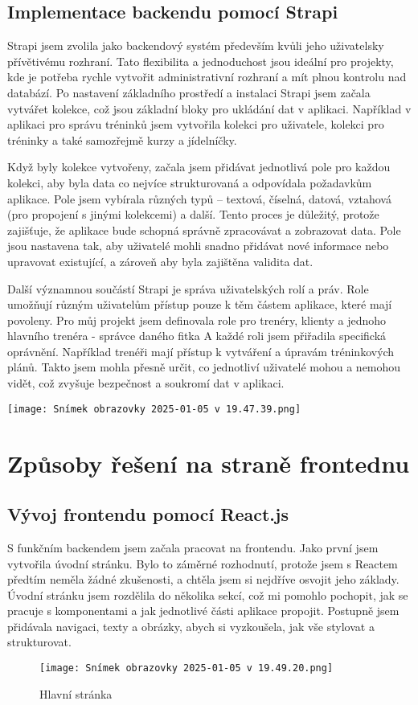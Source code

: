 \documentclass[12pt, a4paper,
twoside,        %
openany
]{report}
\begin{document}
\section{Implementace backendu pomocí Strapi}

Strapi jsem zvolila jako backendový systém především kvůli jeho uživatelsky přívětivému rozhraní. Tato flexibilita a jednoduchost jsou ideální pro projekty, kde je potřeba rychle vytvořit administrativní rozhraní a mít plnou kontrolu nad databází. Po nastavení základního prostředí a instalaci Strapi jsem začala vytvářet kolekce, což jsou základní bloky pro ukládání dat v aplikaci. Například v aplikaci pro správu tréninků jsem vytvořila kolekci pro uživatele, kolekci pro tréninky a také samozřejmě kurzy a jídelníčky.

Když byly kolekce vytvořeny, začala jsem přidávat jednotlivá pole pro každou kolekci, aby byla data co nejvíce strukturovaná a odpovídala požadavkům aplikace. Pole jsem vybírala různých typů – textová, číselná, datová, vztahová (pro propojení s jinými kolekcemi) a další. Tento proces je důležitý, protože zajišťuje, že aplikace bude schopná správně zpracovávat a zobrazovat data. Pole jsou nastavena tak, aby uživatelé mohli snadno přidávat nové informace nebo upravovat existující, a zároveň aby byla zajištěna validita dat.

Další významnou součástí Strapi je správa uživatelských rolí a práv. Role umožňují různým uživatelům přístup pouze k těm částem aplikace, které mají povoleny. Pro můj projekt jsem definovala role pro trenéry, klienty a jednoho hlavního trenéra - správce daného fitka A každé roli jsem přiřadila specifická oprávnění. Například trenéři mají přístup k vytváření a úpravám tréninkových plánů. Takto jsem mohla přesně určit, co jednotliví uživatelé mohou a nemohou vidět, což zvyšuje bezpečnost a soukromí dat v aplikaci.



    \texttt{[image: Snímek obrazovky 2025-01-05 v 19.47.39.png]}

    
\chapter{Způsoby řešení na straně frontednu}
\section {Vývoj frontendu pomocí React.js}
S funkčním backendem jsem začala pracovat na frontendu. Jako první jsem vytvořila úvodní stránku. Bylo to záměrné rozhodnutí, protože jsem s Reactem předtím neměla žádné zkušenosti, a chtěla jsem si nejdříve osvojit jeho základy. Úvodní stránku jsem rozdělila do několika sekcí, což mi pomohlo pochopit, jak se pracuje s komponentami a jak jednotlivé části aplikace propojit. Postupně jsem přidávala navigaci, texty a obrázky, abych si vyzkoušela, jak vše stylovat a strukturovat.
\begin{figure}[h]
    \centering
    \texttt{[image: Snímek obrazovky 2025-01-05 v 19.49.20.png]}
    \caption{Hlavní stránka}
    
\end{figure}
\end{document}
